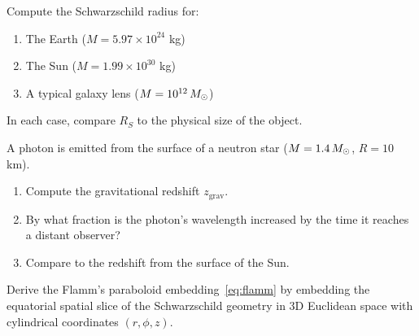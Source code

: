 \begin{exercise}
\label{ex:schwarzschild_radii}
Compute the Schwarzschild radius for:
\begin{enumerate}[label=(\alph*)]
    \item The Earth ($M = 5.97 \times 10^{24}$ kg)
    \item The Sun ($M = 1.99 \times 10^{30}$ kg)
    \item A typical galaxy lens ($M = 10^{12}\, M_{\odot}$)
\end{enumerate}
In each case, compare $R_S$ to the physical size of the object.
\end{exercise}

\begin{exercise}
\label{ex:grav_redshift_calc}
A photon is emitted from the surface of a neutron star ($M = 1.4\,M_{\odot}$,
$R = 10$ km).
\begin{enumerate}[label=(\alph*)]
    \item Compute the gravitational redshift $z_{\mathrm{grav}}$.
    \item By what fraction is the photon's wavelength increased by the time
          it reaches a distant observer?
    \item Compare to the redshift from the surface of the Sun.
\end{enumerate}
\end{exercise}

\begin{exercise}
\label{ex:flamm_derive}
Derive the Flamm's paraboloid embedding~\eqref{eq:flamm} by embedding the
equatorial spatial slice of the Schwarzschild geometry in 3D Euclidean
space with cylindrical coordinates $(r, \phi, z)$.
\end{exercise}
